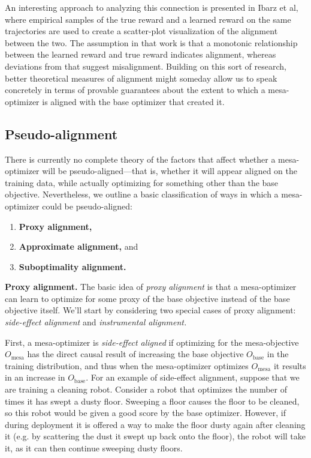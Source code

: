 \documentclass[
  onecolumn,
  natbib,
]{miri-tech-article}
\begin{document}
An interesting approach to analyzing this connection is presented in Ibarz et al, where empirical samples of the true reward and a learned reward on the same trajectories are used to create a scatter-plot visualization of the alignment between the two.\cite{ibarz} The assumption in that work is that a monotonic relationship between the learned reward and true reward indicates alignment, whereas deviations from that suggest misalignment. Building on this sort of research, better theoretical measures of alignment might someday allow us to speak concretely in terms of provable guarantees about the extent to which a mesa-optimizer is aligned with the base optimizer that created it.

\subsection{Pseudo-alignment}
\label{sec:3.1}

There is currently no complete theory of the factors that affect whether a mesa-optimizer will be pseudo-aligned---that is, whether it will appear aligned on the training data, while actually optimizing for something other than the base objective. Nevertheless, we outline a basic classification of ways in which a mesa-optimizer could be pseudo-aligned:
\begin{enumerate}
\item \textbf{Proxy alignment,}
\item \textbf{Approximate alignment,} and
\item \textbf{Suboptimality alignment.}
\end{enumerate}

\textbf{Proxy alignment.} The basic idea of \textit{proxy alignment} is that a mesa-optimizer can learn to optimize for some proxy of the base objective instead of the base objective itself. We'll start by considering two special cases of proxy alignment: \textit{side-effect alignment} and \textit{instrumental alignment.}

First, a mesa-optimizer is \textit{side-effect aligned} if optimizing for the mesa-objective $O_\text{mesa}$ has the direct causal result of increasing the base objective $O_\text{base}$ in the training distribution, and thus when the mesa-optimizer optimizes $O_\text{mesa}$ it results in an increase in $O_\text{base}$. For an example of side-effect alignment, suppose that we are training a cleaning robot. Consider a robot that optimizes the number of times it has swept a dusty floor. Sweeping a floor causes the floor to be cleaned, so this robot would be given a good score by the base optimizer. However, if during deployment it is offered a way to make the floor dusty again after cleaning it (e.g. by scattering the dust it swept up back onto the floor), the robot will take it, as it can then continue sweeping dusty floors.
\end{document}
